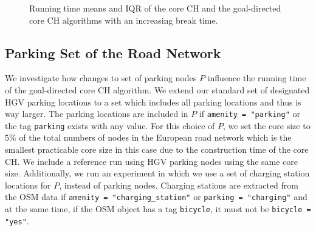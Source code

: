 \begin{figure}[hbtp]
	\centering
	\hfill
	\caption{Running time means and IQR of the core CH and the goal-directed core CH algorithms with an increasing break time.}
	\label{fig:eval_break_time}
\end{figure}


\subsection{Parking Set of the Road Network}
We investigate how changes to set of parking nodes $P$ influence the running time of the goal-directed core CH algorithm. We extend our standard set of designated HGV parking locations to a set which includes all parking locations and thus is way larger. The parking locations are included in $P$ if  \texttt{amenity = "parking"} or the tag \texttt{parking} exists with any value. For this choice of $P$, we set the core size to $5\%$ of the total numbers of nodes in the European road network which is the smallest practicable core size in this case due to the construction time of the core CH. We include a reference run using HGV parking nodes using the same core size. Additionally, we run an experiment in which we use a set of charging station locations for $P$, instead of parking nodes. Charging stations are extracted from the OSM data if \texttt{amenity = "charging\_station"} or \texttt{parking = "charging"} and at the same time, if the OSM object has a tag \texttt{bicycle}, it must not be \texttt{bicycle = "yes"}.

